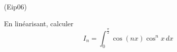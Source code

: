 \begin{tiny}(Eip06)\end{tiny}
En linéarisant, calculer
\begin{displaymath}
 I_n =\int_0^{\frac{\pi}{2}}\cos(nx)\cos^nx\,dx
\end{displaymath}
